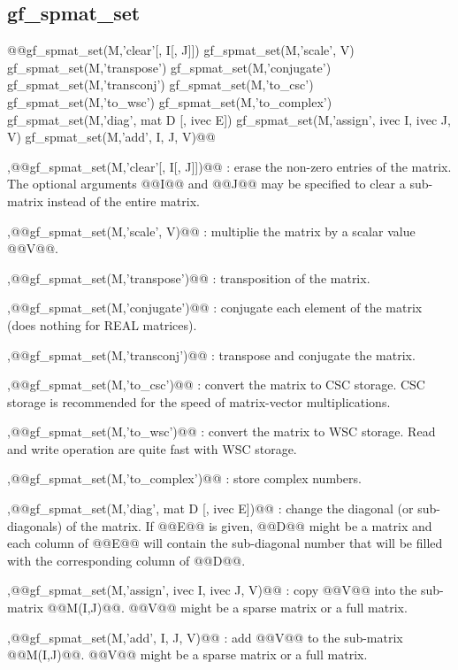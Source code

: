 \subsection{gf\_spmat_set}
\begin{synopsis}
@@gf_spmat_set(M,'clear'[, I[, J]])
gf_spmat_set(M,'scale', V)
gf_spmat_set(M,'transpose')
gf_spmat_set(M,'conjugate')
gf_spmat_set(M,'transconj')
gf_spmat_set(M,'to_csc')
gf_spmat_set(M,'to_wsc')
gf_spmat_set(M,'to_complex')
gf_spmat_set(M,'diag', mat D [, ivec E])
gf_spmat_set(M,'assign', ivec I, ivec J, V)
gf_spmat_set(M,'add', I, J, V)@@\end{synopsis}
\begin{cmddescription}
  \sep{@@gf_spmat_set(M,'clear'[, I[, J]])@@} : erase the non-zero entries of
  the matrix.  The optional arguments @@I@@ and @@J@@ may be specified
  to clear a sub-matrix instead of the entire matrix.

  \sep{@@gf_spmat_set(M,'scale', V)@@} : multiplie the matrix by a scalar value @@V@@.

  \sep{@@gf_spmat_set(M,'transpose')@@} : transposition of the matrix.
  
  \sep{@@gf_spmat_set(M,'conjugate')@@} : conjugate each element of the matrix (does nothing for REAL matrices).

  \sep{@@gf_spmat_set(M,'transconj')@@} : transpose and conjugate the matrix.

  \sep{@@gf_spmat_set(M,'to_csc')@@} : convert the matrix to CSC storage. CSC
  storage is recommended for the speed of matrix-vector
  multiplications.

  \sep{@@gf_spmat_set(M,'to_wsc')@@} : convert the matrix to WSC storage. Read and write operation are quite fast
  with WSC storage.

  \sep{@@gf_spmat_set(M,'to_complex')@@} : store complex numbers.

  \sep{@@gf_spmat_set(M,'diag', mat D [, ivec E])@@} : change the diagonal (or
  sub-diagonals) of the matrix.  If @@E@@ is given, @@D@@ might be a
  matrix and each column of @@E@@ will contain the sub-diagonal number
  that will be filled with the corresponding column of @@D@@.

  \sep{@@gf_spmat_set(M,'assign', ivec I, ivec J, V)@@} : copy @@V@@ into the
  sub-matrix @@M(I,J)@@.  @@V@@ might be a sparse matrix or a full
  matrix.

  \sep{@@gf_spmat_set(M,'add', I, J, V)@@} : add @@V@@ to the sub-matrix
  @@M(I,J)@@.  @@V@@ might be a sparse matrix or a full matrix.
\end{cmddescription}
\newpage


